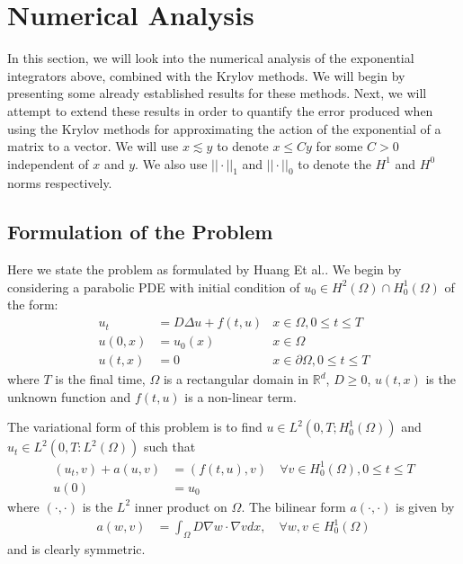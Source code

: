 \section{Numerical Analysis}

In this section, we will look into the numerical analysis of the exponential integrators above, combined with the Krylov methods.
We will begin by presenting some already established results for these methods.
Next, we will attempt to extend these results in order to quantify the error produced when using the Krylov methods for approximating the action of the exponential of a matrix to a vector.
We will use $x \lesssim y$ to denote $x \leq C y$ for some $C>0$ independent of $x$ and $y$.
We also use $||\cdot||_1$ and $||\cdot||_0$ to denote the $H^1$ and $H^0$ norms respectively.
\subsection{Formulation of the Problem}
Here we state the problem as formulated by Huang Et al.\cite{Huang2022}.
We begin by considering a parabolic PDE with initial condition of $u_0 \in H^2(\Omega) \cap H^1_0(\Omega)$ of the form:
\begin{align*}
    u_t &= D \Delta u + f(t,u) &x\in \Omega, 0 \leq t \leq T\\
    u(0,x) &= u_0(x) &x\in \Omega\\
    u(t,x) &= 0 &x\in \partial \Omega, 0 \leq t \leq T
\end{align*}
where $T$ is the final time, $\Omega$ is a rectangular domain in $\mathbb{R}^d$, $D\geq 0$, $u(t,x)$ is the unknown function and $f(t,u)$ is a non-linear term.

The variational form of this problem is to find $u\in L^2(0,T;H^1_0(\Omega))$ and $u_t \in L^2(0,T: L^2(\Omega))$ such that
\begin{align*}
    (u_t, v) + a(u, v) &= (f(t,u),v) \quad \forall v \in H^1_0(\Omega), 0\leq t \leq T\\
    u(0) &= u_0
\end{align*}
where $(\cdot,\cdot)$ is the $L^2$ inner product on $\Omega$.
The bilinear form $a(\cdot,\cdot)$ is given by
\begin{align*}
    a(w,v) &= \int_{\Omega} D \nabla w \cdot \nabla v dx, \quad \forall w, v \in H^1_0(\Omega)
\end{align*}
and is clearly symmetric.

